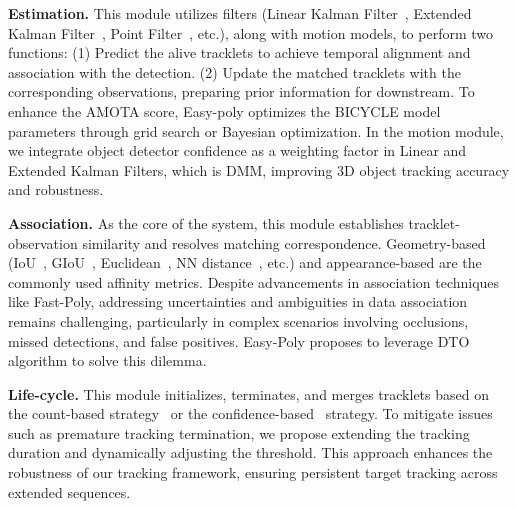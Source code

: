 \textbf{Estimation.}
This module utilizes filters (Linear Kalman Filter~\cite{kim2021eagermot, li2023camo, pang2022simpletrack, PC3T}, Extended Kalman Filter~\cite{li2023poly}, Point Filter~\cite{benbarka2021score, yin2021center}, etc.), along with motion models, to perform two functions:
(1) Predict the alive tracklets to achieve temporal alignment and association with the detection. (2) Update the matched tracklets with the corresponding observations, preparing prior information for downstream. To enhance the AMOTA score, Easy-poly optimizes the BICYCLE model parameters through grid search or Bayesian optimization. In the motion module, we integrate object detector confidence as a weighting factor in Linear and Extended Kalman Filters, which is DMM, improving 3D object tracking accuracy and robustness.

\textbf{Association.}
As the core of the system, this module establishes tracklet-observation similarity and resolves matching correspondence. Geometry-based (IoU~\cite{weng20203d, wang2022deepfusionmot}, GIoU~\cite{li2023camo, li2023poly, pang2022simpletrack}, Euclidean~\cite{benbarka2021score, PC3T, kim2021eagermot}, NN distance~\cite{ding20233dmotformer, sadjadpour2023shasta, zaech2022learnable, gwak2022minkowski}, etc.) and appearance-based are the commonly used affinity metrics. Despite advancements in association techniques like Fast-Poly, addressing uncertainties and ambiguities in data association remains challenging, particularly in complex scenarios involving occlusions, missed detections, and false positives. Easy-Poly proposes to leverage DTO algorithm to solve this dilemma.

 \textbf{Life-cycle.}
This module initializes, terminates, and merges tracklets based on the count-based strategy~\cite{kim2021eagermot, li2023camo, li2023poly, pang2022simpletrack, wang2022deepfusionmot, weng20203d} or the confidence-based~\cite{benbarka2021score, li2023poly, pang2022simpletrack, PC3T} strategy. To mitigate issues such as premature tracking termination, we propose extending the tracking duration and dynamically adjusting the threshold. This approach enhances the robustness of our tracking framework, ensuring persistent target tracking across extended sequences.







